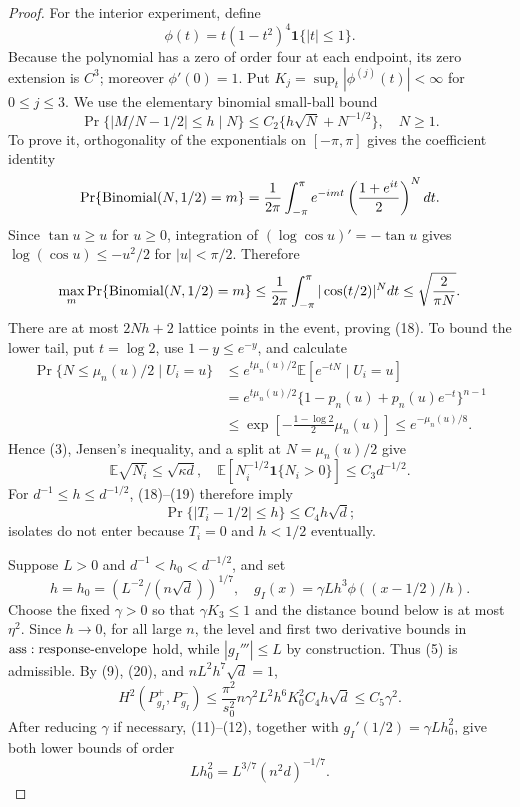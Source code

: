 \documentclass{article}
\begin{document}
\begin{proof}
For the interior experiment, define
\[
 \phi(t)=t(1-t^2)^4\mathbf1\{|t|\leq1\}.
\tag{17}
\]
Because the polynomial has a zero of order four at each endpoint, its zero extension is \(C^3\); moreover \(\phi'(0)=1\).  Put \(K_j=\sup_t|\phi^{(j)}(t)|<\infty\) for \(0\leq j\leq3\).  We use the elementary binomial small-ball bound
\[
 \Pr\{|M/N-1/2|\leq h\mid N\}
 \leq C_2\{h\sqrt N+N^{-1/2}\},\quad N\geq1.
\tag{18}
\]
To prove it, orthogonality of the exponentials on \([-\pi,\pi]\) gives the coefficient identity
\[
 \Pr\{{\rm Binomial}(N,1/2)=m\}
 =\frac1{2\pi}\int_{-\pi}^{\pi}
 e^{-imt}\left(\frac{1+e^{it}}2\right)^Ndt.
\]
Since \(\tan u\geq u\) for \(u\geq0\), integration of \((\log\cos u)'=-\tan u\) gives \(\log(\cos u)\leq-u^2/2\) for \(|u|<\pi/2\).  Therefore
\[
 \max_m\Pr\{{\rm Binomial}(N,1/2)=m\}
 \leq\frac1{2\pi}\int_{-\pi}^{\pi}|\cos(t/2)|^Ndt
 \leq\sqrt{\frac2{\pi N}}.
\]
There are at most \(2Nh+2\) lattice points in the event, proving (18).  To bound the lower tail, put \(t=\log2\), use \(1-y\leq e^{-y}\), and calculate
\[
\begin{aligned}
 \Pr\{N\leq\mu_n(u)/2\mid U_i=u\}
 &\leq e^{t\mu_n(u)/2}\mathbb E[e^{-tN}\mid U_i=u]\\
 &=e^{t\mu_n(u)/2}\{1-p_n(u)+p_n(u)e^{-t}\}^{n-1}\\
 &\leq\exp\!\left[-\frac{1-\log2}{2}\mu_n(u)\right]
 \leq e^{-\mu_n(u)/8}.
\end{aligned}
\]
Hence (3), Jensen's inequality, and a split at \(N=\mu_n(u)/2\) give
\[
 \mathbb E\sqrt{N_i}\leq\sqrt{\kappa d},
 \quad
 \mathbb E[N_i^{-1/2}\mathbf1\{N_i>0\}]\leq C_3d^{-1/2}.
\tag{19}
\]
For \(d^{-1}\leq h\leq d^{-1/2}\), (18)--(19) therefore imply
\[
 \Pr\{|T_i-1/2|\leq h\}\leq C_4h\sqrt d;
\tag{20}
\]
isolates do not enter because \(T_i=0\) and \(h<1/2\) eventually.

Suppose \(L>0\) and \(d^{-1}<h_0<d^{-1/2}\), and set
\[
 h=h_0=(L^{-2}/(n\sqrt d))^{1/7},
 \quad g_I(x)=\gamma Lh^3\phi((x-1/2)/h).
\tag{21}
\]
Choose the fixed \(\gamma>0\) so that \(\gamma K_3\leq1\) and the distance bound below is at most \(\eta^2\).  Since \(h\to0\), for all large \(n\), the level and first two derivative bounds in \({\rm ass:response\text{-}envelope}\) hold, while \(|g_I'''|\leq L\) by construction.  Thus (5) is admissible.  By (9), (20), and \(nL^2h^7\sqrt d=1\),
\[
 H^2(P_{g_I}^+,P_{g_I}^-)
 \leq\frac{\pi^2}{s_0^2}n\gamma^2L^2h^6K_0^2C_4h\sqrt d
 \leq C_5\gamma^2.
\tag{22}
\]
After reducing \(\gamma\) if necessary, (11)--(12), together with \(g_I'(1/2)=\gamma Lh_0^2\), give both lower bounds of order
\[
 Lh_0^2=L^{3/7}(n^2d)^{-1/7}.
\tag{23}
\]


\end{proof}
\end{document}
